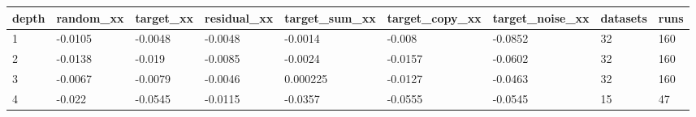 \begin{tabular}{lllllllll}
\toprule
depth & random\_xx & target\_xx & residual\_xx & target\_sum\_xx & target\_copy\_xx & target\_noise\_xx & datasets & runs \\
\midrule
1 & -0.0105 & -0.0048 & -0.0048 & -0.0014 & -0.008 & -0.0852 & 32 & 160 \\
2 & -0.0138 & -0.019 & -0.0085 & -0.0024 & -0.0157 & -0.0602 & 32 & 160 \\
3 & -0.0067 & -0.0079 & -0.0046 & 0.000225 & -0.0127 & -0.0463 & 32 & 160 \\
4 & -0.022 & -0.0545 & -0.0115 & -0.0357 & -0.0555 & -0.0545 & 15 & 47 \\
\bottomrule
\end{tabular}
